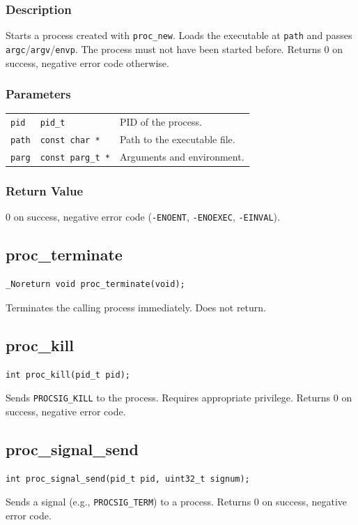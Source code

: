 \documentclass[12pt,a4paper]{article}
\begin{document}
\subsubsection{Description}
Starts a process created with \texttt{proc\_new}. Loads the executable at \texttt{path} and passes \texttt{argc}/\texttt{argv}/\texttt{envp}. The process must not have been started before. Returns 0 on success, negative error code otherwise.

\subsubsection{Parameters}
\begin{tabularx}{\textwidth}{|l|l|X|}
\hline
\verb|pid| & \verb|pid_t| & PID of the process. \\
\verb|path| & \verb|const char *| & Path to the executable file. \\
\verb|parg| & \verb|const parg_t *| & Arguments and environment. \\
\hline
\end{tabularx}

\subsubsection{Return Value}
0 on success, negative error code (\texttt{-ENOENT}, \texttt{-ENOEXEC}, \texttt{-EINVAL}).

\subsection{proc\_terminate}
\begin{lstlisting}
_Noreturn void proc_terminate(void);
\end{lstlisting}
Terminates the calling process immediately. Does not return.

\subsection{proc\_kill}
\begin{lstlisting}
int proc_kill(pid_t pid);
\end{lstlisting}
Sends \texttt{PROCSIG\_KILL} to the process. Requires appropriate privilege. Returns 0 on success, negative error code.

\subsection{proc\_signal\_send}
\begin{lstlisting}
int proc_signal_send(pid_t pid, uint32_t signum);
\end{lstlisting}
Sends a signal (e.g., \texttt{PROCSIG\_TERM}) to a process. Returns 0 on success, negative error code.
\end{document}
